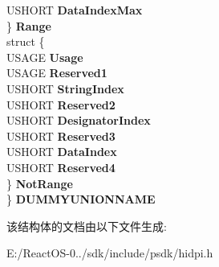 \begin{DoxyCompactItemize}
\begin{tabbing}
\>\>USHORT {\bfseries DataIndexMax}\\
\>\} {\bfseries Range}\\
\>struct \{\\
\>\>USAGE {\bfseries Usage}\\
\>\>USAGE {\bfseries Reserved1}\\
\>\>USHORT {\bfseries StringIndex}\\
\>\>USHORT {\bfseries Reserved2}\\
\>\>USHORT {\bfseries DesignatorIndex}\\
\>\>USHORT {\bfseries Reserved3}\\
\>\>USHORT {\bfseries DataIndex}\\
\>\>USHORT {\bfseries Reserved4}\\
\>\} {\bfseries NotRange}\\
\} {\bfseries DUMMYUNIONNAME}\\

\end{tabbing}\end{DoxyCompactItemize}


该结构体的文档由以下文件生成\+:\begin{DoxyCompactItemize}
\item 
E\+:/\+React\+O\+S-\/0../sdk/include/psdk/hidpi.\+h\end{DoxyCompactItemize}
